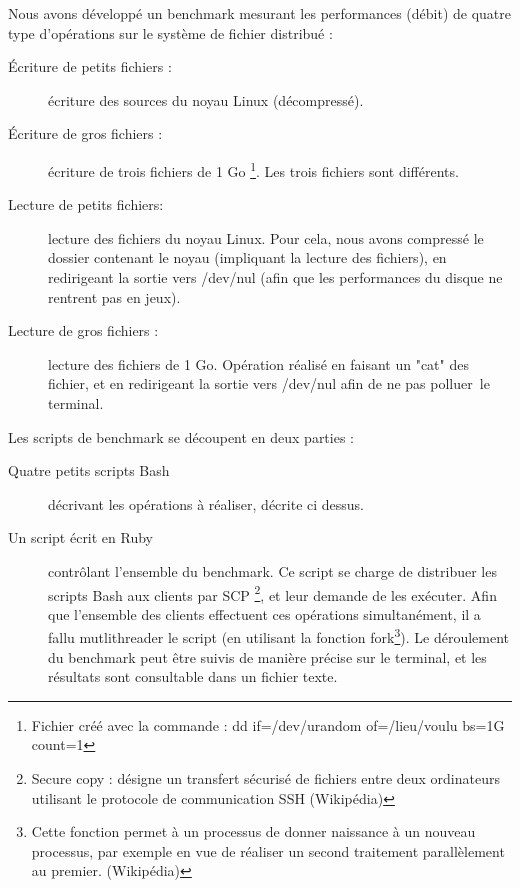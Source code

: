 \documentclass[12pt]{report}
\begin{document}
			Nous avons développé un benchmark mesurant les performances (débit) de quatre type d'opérations sur le système de fichier distribué :
			\begin{description}
				\item[Écriture de petits fichiers :] écriture des sources du noyau Linux (décompressé).
				\item[Écriture de gros fichiers :] écriture de trois fichiers de 1 Go
				\footnote{Fichier créé avec la commande : dd if=/dev/urandom of=/lieu/voulu bs=1G count=1}. Les trois fichiers sont différents.
				\item[Lecture de petits fichiers: ] lecture des fichiers du noyau Linux.
				Pour cela, nous avons compressé le dossier contenant le noyau (impliquant la lecture des fichiers),
				en redirigeant la sortie vers /dev/nul (afin que les performances du disque ne rentrent pas en jeux).
				\item[Lecture de gros fichiers :] lecture des fichiers de 1 Go. Opération réalisé en faisant un "cat" des fichier,
				et en redirigeant la sortie vers /dev/nul afin de ne pas \og polluer\fg~le terminal.\\
			\end{description}

			Les scripts de benchmark se découpent en deux parties :
			\begin{description}
				\item[Quatre petits scripts Bash]décrivant les opérations à réaliser, décrite ci dessus.
				\item[Un script écrit en Ruby] contrôlant l'ensemble du benchmark.
				Ce script se charge de distribuer les scripts Bash aux clients par SCP
				\footnote{Secure copy : désigne un transfert sécurisé de fichiers entre deux ordinateurs utilisant le protocole de communication SSH (Wikipédia)},
				et leur demande de les exécuter. Afin que l'ensemble des clients effectuent ces opérations simultanément, il a fallu mutlithreader le script
				(en utilisant la fonction fork\footnote{Cette fonction permet à un processus de donner naissance à un nouveau processus,
				par exemple en vue de réaliser un second traitement parallèlement au premier. (Wikipédia)}).
				Le déroulement du benchmark peut être suivis de manière précise sur le terminal, et les résultats sont consultable dans un fichier texte.
			\end{description}
\end{document}
